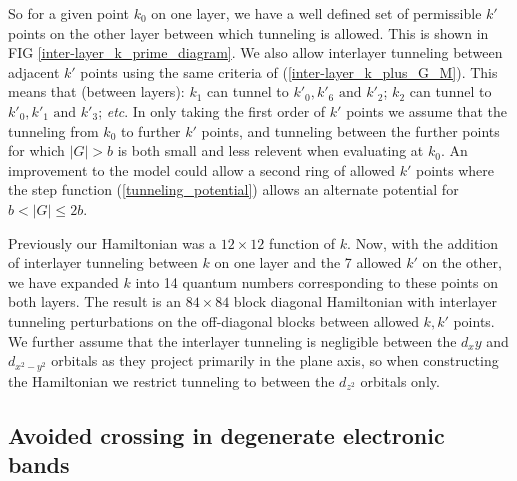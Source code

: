 \documentclass[12pt]{report} %
\begin{document}
  So for a given point $k_0$ on one layer, we have a well defined set of permissible $k'$ points on the other layer between which tunneling is allowed. This is shown in FIG \ref{inter-layer_k_prime_diagram}. We also allow interlayer tunneling between adjacent $k'$ points using the same criteria of (\ref{inter-layer_k_plus_G_M}). This means that (between layers): $k_1$ can tunnel to $k'_0, k'_6 \text{ and } k'_2$; $k_2$ can tunnel to $k'_0, k'_1 \text{ and } k'_3$; \textit{etc}. In only taking the first order of $k'$ points we assume that the tunneling from $k_0$ to further $k'$ points, and tunneling between the further points for which $|G| > b$ is both small and less relevent when evaluating at $k_0$. An improvement to the model could allow a second ring of allowed $k'$ points where the step function (\ref{tunneling_potential}) allows an alternate potential for $b < |G| \leq 2b$.

  Previously our Hamiltonian was a $12\times12$ function of $k$. Now, with the  addition of interlayer tunneling between $k$ on one layer and the 7 allowed $k'$ on the other, we have expanded $k$ into 14 quantum numbers corresponding to these points on both layers. The result is an $84\times84$ block diagonal Hamiltonian with interlayer tunneling perturbations on the off-diagonal blocks between allowed $k, k'$ points. We further assume that the interlayer tunneling is negligible between the $d_xy$ and $d_{x^2-y^2}$ orbitals as they project primarily in the plane axis, so when constructing the Hamiltonian we restrict tunneling to between the $d_{z^2}$ orbitals only.

\subsection*{Avoided crossing in degenerate electronic bands}
\end{document}
